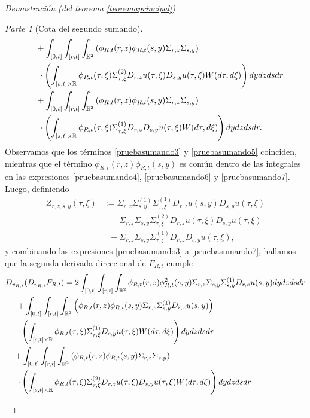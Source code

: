 \documentclass[letterpaper,twoside,12pt]{book}
\newcommand{\R}{\mathbb{R}}
\newcommand{\1}{\mathds{1}}
\theoremstyle{definition}
\theoremstyle{definition}
\theoremstyle{remark}
\newtheorem{proofpart}{Parte}
\theoremstyle{definition}
\theoremstyle{definition}
\theoremstyle{definition}
\theoremstyle{definition}
\theoremstyle{definition}
\begin{document}
\begin{proof}[Demostración (del teorema \ref{teoremaprincipal})]
\begin{proofpart}[Cota del segundo sumando]
\begin{align}
   &\ \ \ +\int_{[0,t]}\int_{[r,t]}\int_{\R^2}\left(\phi_{R,t}(r,z)\phi_{R,t}(s,y)\Sigma_{r,z}\Sigma_{s,y}\right)\notag\\
   &\ \ \ \ \cdot\left(\int_{[s,t]\times \R} \phi_{R,t}(\tau,\xi)\Sigma^{(2)}_{\tau,\xi}D_{r,z}u(\tau,\xi)D_{s,y}u(\tau,\xi)W(d\tau,d\xi)\right) dy dz ds dr\label{pruebasumando6}\\
   &\ \ \ +\int_{[0,t]}\int_{[r,t]}\int_{\R^2}\left(\phi_{R,t}(r,z)\phi_{R,t}(s,y)\Sigma_{r,z}\Sigma_{s,y}\right)\notag\\
   &\ \ \ \ \cdot\left(\int_{[s,t]\times \R}\phi_{R,t}(\tau,\xi)\Sigma^{(1)}_{\tau,\xi}D_{r,z}D_{s,y}u(\tau,\xi)W(d\tau,d\xi)\right) dy dz ds dr.\label{pruebasumando7}
\end{align}
Observamos que los términos \eqref{pruebasumando3} y \eqref{pruebasumando5} coinciden, mientras que el término $\phi_{R,t}(r,z)\phi_{R,t}(s,y)$ es común dentro de las integrales en las expresiones \eqref{pruebasumando4}, \eqref{pruebasumando6} y \eqref{pruebasumando7}. Luego, definiendo 
\begin{align*}
   Z_{r,z,s,y}(\tau,\xi)&:=\Sigma_{r,z}\Sigma_{s,y}^{(1)}\Sigma_{\tau,\xi}^{(1)}D_{r,z}u(s,y)D_{s,y}u(\tau,\xi)\\
   &\ \ \ +\Sigma_{r,z}\Sigma_{s,y}\Sigma_{\tau,\xi}^{(2)}D_{r,z}u(\tau,\xi)D_{s,y}u(\tau,\xi)\\
   &\ \ \ +\Sigma_{r,z}\Sigma_{s,y}\Sigma_{\tau,\xi}^{(1)}D_{r,z}D_{s,y}u(\tau,\xi),
\end{align*}
y combinando las expresiones \eqref{pruebasumando3} a \eqref{pruebasumando7}, hallamos que la segunda derivada direccional de $F_{R,t}$ cumple
\begin{align}
   &D_{v_{R,t}}(D_{v_{R,t}}F_{R,t})=2\int_{[0,t]}\int_{[r,t]}\int_{\R^2}\phi_{R,t}(r,z)\phi_{R,t}^2(s,y)\Sigma_{r,z}\Sigma_{s,y}\Sigma^{(1)}_{s,y}D_{r,z}u(s,y)dy dz ds dr\notag\\
   &\ \ \ \ + \int_{[0,t]}\int_{[r,t]}\int_{\R^2}\left(\phi_{R,t}(r,z)\phi_{R,t}(s,y)\Sigma_{r,z}\Sigma_{s,y}^{(1)}D_{r,z}u(s,y)\right)\notag\\
   & \ \ \ \ \cdot \left(\int_{[s,t]\times\R}\phi_{R,t}(\tau,\xi)\Sigma_{\tau,\xi}^{(1)}D_{s,y}u(\tau,\xi)W(d\tau,d\xi)\right)dy dz ds dr\notag\\
   &\ \ \ +\int_{[0,t]}\int_{[r,t]}\int_{\R^2}\left(\phi_{R,t}(r,z)\phi_{R,t}(s,y)\Sigma_{r,z}\Sigma_{s,y}\right)\notag\\
   &\ \ \ \ \cdot \left(\int_{[s,t]\times\R}\phi_{R,t}(\tau,\xi)\Sigma_{\tau,\xi}^{(2)}D_{r,z}u(\tau,\xi)D_{s,y}u(\tau,\xi)W(d\tau,d\xi)\right)dy dz ds dr\notag\\

\end{align}
\end{proofpart}
\end{proof}
\end{document}
